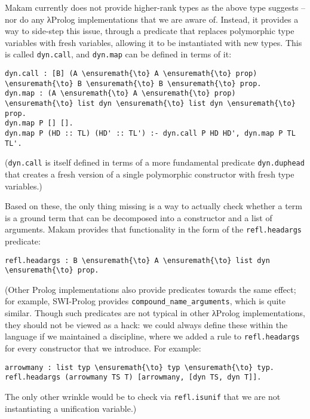 Makam currently does not provide higher-rank types as the above type
suggests -- nor do any \foreignlanguage{greek}{λ}Prolog implementations that we are aware of.
Instead, it provides a way to side-step this issue, through a predicate
that replaces polymorphic type variables with fresh variables, allowing
it to be instantiated with new types. This is called \texttt{dyn.call},
and \texttt{dyn.map} can be defined in terms of it:

\begin{verbatim}
dyn.call : [B] (A \ensuremath{\to} A \ensuremath{\to} prop) \ensuremath{\to} B \ensuremath{\to} B \ensuremath{\to} prop.
dyn.map : (A \ensuremath{\to} A \ensuremath{\to} prop) \ensuremath{\to} list dyn \ensuremath{\to} list dyn \ensuremath{\to} prop.
dyn.map P [] [].
dyn.map P (HD :: TL) (HD' :: TL') :- dyn.call P HD HD', dyn.map P TL TL'.
\end{verbatim}

(\texttt{dyn.call} is itself defined in terms of a more fundamental
predicate \texttt{dyn.duphead} that creates a fresh version of a single
polymorphic constructor with fresh type variables.)

Based on these, the only thing missing is a way to actually check
whether a term is a ground term that can be decomposed into a
constructor and a list of arguments. Makam provides that functionality
in the form of the \texttt{refl.headargs} predicate:

\begin{verbatim}
refl.headargs : B \ensuremath{\to} A \ensuremath{\to} list dyn \ensuremath{\to} prop.
\end{verbatim}

(Other Prolog implementations also provide predicates towards the same
effect; for example, SWI-Prolog provides
\texttt{compound\_name\_arguments}, which is quite similar. Though such
predicates are not typical in other \foreignlanguage{greek}{λ}Prolog implementations, they should
not be viewed as a hack: we could always define these within the
language if we maintained a discipline, where we added a rule to
\texttt{refl.headargs} for every constructor that we introduce. For
example:

\begin{verbatim}
arrowmany : list typ \ensuremath{\to} typ \ensuremath{\to} typ.
refl.headargs (arrowmany TS T) [arrowmany, [dyn TS, dyn T]].
\end{verbatim}

The only other wrinkle would be to check via \texttt{refl.isunif} that
we are not instantiating a unification variable.)


